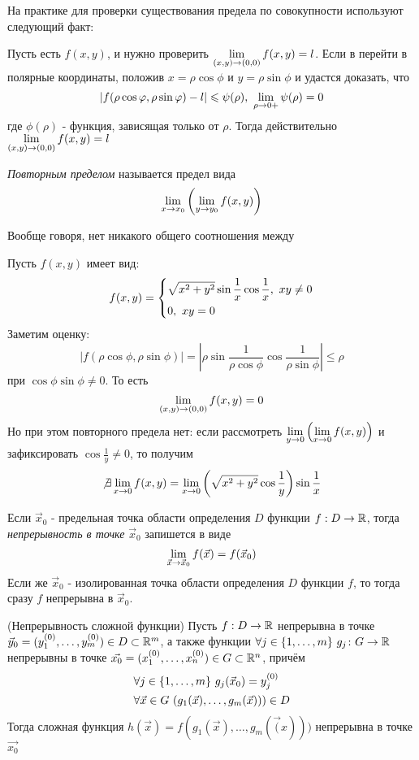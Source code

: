\begin{addition}
	На практике для проверки существования предела по совокупности используют следующий факт:
	
	Пусть есть $f(x, y)$, и нужно проверить $\lim\limits_{(x, y) \to (0, 0)} f(x, y) = l$. Если в перейти в полярные координаты, положив $x = \rho \cos \phi$ и $y = \rho \sin \phi$ и удастся доказать, что
	\[
		|f(\rho \cos\varphi, \rho \sin\varphi) - l| \leqslant \psi(\rho),\ \lim\limits_{\rho \to 0+} \psi(\rho) = 0
	\]
	где $\phi(\rho)$ - функция, зависящая только от $\rho$. Тогда действительно $\lim\limits_{(x, y) \to (0, 0)} f(x, y) = l$
\end{addition}

\begin{definition}
	\textit{Повторным пределом} называется предел вида
	\[
		\lim\limits_{x \to x_0} \left(\lim\limits_{y \to y_0} f(x, y)\right)
	\]
\end{definition}

\begin{note}
	Вообще говоря, нет никакого общего соотношения между 
\end{note}

\begin{example}
	Пусть $f(x, y)$ имеет вид:
	\[
		f(x, y) = \System{
			&{\sqrt{x^2 + y^2} \sin \frac{1}{x} \cos \frac{1}{x}},\ xy \neq 0
			\\
			&{0,\ xy = 0}
		}
	\]
	Заметим оценку:
	\[
		|f(\rho\cos\phi, \rho\sin\phi)| =  \left|\rho\sin\frac{1}{\rho\cos\phi}\cos\frac{1}{\rho\sin\phi}\right| \le \rho
	\]
	при $\cos\phi\sin\phi \neq 0$. То есть
	\[
		\lim\limits_{(x, y) \to (0, 0)} f(x, y) = 0
	\]
	Но при этом повторного предела нет: если рассмотреть $\lim\limits_{y \to 0} \left(\lim\limits_{x \to 0} f(x, y)\right)$ и зафиксировать $\cos \frac{1}{y} \neq 0$, то получим
	\[
		\not\exists \lim\limits_{x \to 0} f(x, y) = \lim\limits_{x \to 0} \left(\sqrt{x^2 + y^2} \cos\frac{1}{y}\right)\sin\frac{1}{x}
	\]
\end{example}

\begin{definition}
	Если $\vec{x}_0$ - предельная точка области определения $D$ функции $f: D \to \mathbb{R}$, тогда \textit{непрерывность в точке} $\vec{x}_0$ запишется в виде
	\[
		\lim\limits_{\vec{x} \to \vec{x}_0} f(\vec{x}) = f(\vec{x}_0)
	\]
	Если же $\vec{x}_0$ - изолированная точка области определения $D$ функции $f$, то тогда сразу $f$ непрерывна в $\vec{x}_0$.
\end{definition}

\begin{theorem} (Непрерывность сложной функции)
	Пусть $f: D \to \mathbb{R}$ непрерывна в точке $\vec{y}_0 = (y_1^{(0)}, \ldots, y_m^{(0)}) \in D \subset \mathbb{R}^m$, а также функции $\forall j \in \{1, \ldots, m\}\ g_j \colon G \to \mathbb{R}$ непрерывны в точке $\vec{x_0} = (x_1^{(0)}, \ldots, x_n^{(0)}) \in G \subset \mathbb{R}^n$, причём
	\begin{align*}
		&{\forall j \in \{1, \ldots, m\}\ g_j(\vec{x}_0) = y_j^{(0)}}
		\\
		&{\forall \vec{x} \in G\ (g_1(\vec{x}), \ldots, g_m(\vec{x}))) \in D}
	\end{align*}
	Тогда сложная функция $h(\vec{x}) = f(g_1(\vec{x}), \ldots, g_m(\vec(x)))$ непрерывна в точке $\vec{x_0}$
\end{theorem}

